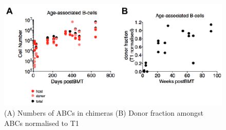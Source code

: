 \documentclass[12pt]{article}
\begin{document}
%

\begin{figure}[htbp] %
   \centering
   \includegraphics[width=\linewidth]{ABCs.pdf} 
   \caption{(A) Numbers of ABCs in chimeras (B) Donor fraction amongst ABCs normalised to T1 }
   \label{fig:ABCs}
\end{figure}
\end{document}
